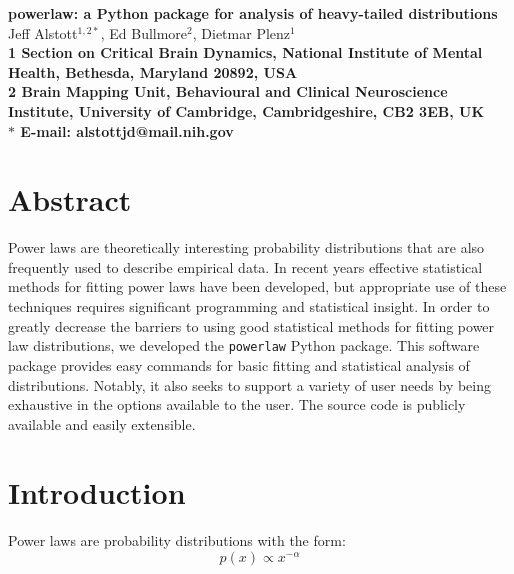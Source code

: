 \documentclass[10pt]{article}
\date{}
\begin{document}
\begin{flushleft}
{\Large
\textbf{powerlaw: a Python package for analysis of heavy-tailed distributions}
}
\\
Jeff Alstott$^{1,2\ast}$, Ed Bullmore$^{2}$, Dietmar Plenz$^{1}$
\\
\bf{1} Section on Critical Brain Dynamics, National Institute of Mental Health, Bethesda, Maryland 20892, USA
\\
\bf{2} Brain Mapping Unit, Behavioural and Clinical Neuroscience Institute, University of Cambridge, Cambridgeshire, CB2 3EB, UK
\\
$\ast$ E-mail: alstottjd@mail.nih.gov
\end{flushleft}

\section*{Abstract}
Power laws are theoretically interesting probability distributions that are also frequently used to describe empirical data. In recent years effective statistical methods for fitting power laws have been developed, but appropriate use of these techniques requires significant programming and statistical insight. In order to greatly decrease the barriers to using good statistical methods for fitting power law distributions, we developed the \verb$powerlaw$ Python package. This software package provides easy commands for basic fitting and statistical analysis of distributions. Notably, it also seeks to support a variety of user needs by being exhaustive in the options available to the user. The source code is publicly available and easily extensible.

\section*{Introduction}
Power laws are probability distributions with the form:
\begin{equation}
p(x) \propto x^{-\alpha}
\end{equation}
\end{document}
